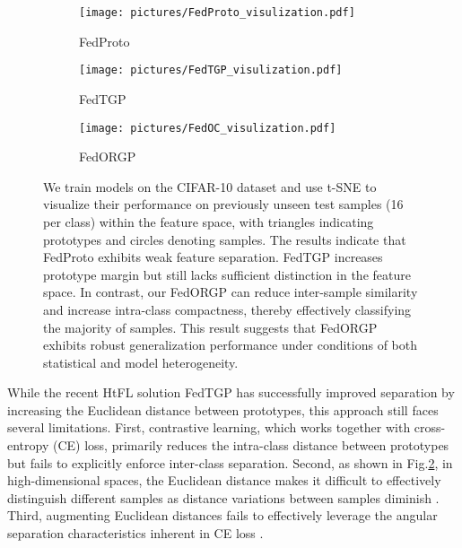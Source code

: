 \begin{figure*}[t]
    \centering
    \begin{subfigure}[b]{0.33\linewidth}
        \texttt{[image: pictures/FedProto\_visulization.pdf]}
        \caption{FedProto}
        \label{fig:FedProto t-SNE}
    \end{subfigure}
    \begin{subfigure}[b]{0.33\linewidth}
        \texttt{[image: pictures/FedTGP\_visulization.pdf]}
        \caption{FedTGP}
        \label{fig:FedTGP t-SNE}
    \end{subfigure}
    \begin{subfigure}[b]{0.33\linewidth}
        \texttt{[image: pictures/FedOC\_visulization.pdf]}
        \caption{FedORGP}
        \label{fig:FedORGP t-SNE}
    \end{subfigure}
    \caption{We train models on the CIFAR-10 dataset and use t-SNE \cite{t-sne} to visualize their performance on previously unseen test samples (16 per class) within the feature space, with triangles indicating prototypes and circles denoting samples. The results indicate that FedProto \cite{tan2022fedproto} exhibits weak feature separation. FedTGP \cite{fedtgp} increases prototype margin but still lacks sufficient distinction in the feature space. In contrast, our FedORGP can reduce inter-sample similarity and increase intra-class compactness, thereby effectively classifying the majority of samples. This result suggests that FedORGP exhibits robust generalization performance under conditions of both statistical and model heterogeneity.}
    \label{fig:distributions}
\end{figure*}

While the recent HtFL solution FedTGP \cite{fedtgp} has successfully improved separation by increasing the Euclidean distance between prototypes, this approach still faces several limitations. First, contrastive learning, which works together with cross-entropy (CE) loss, primarily reduces the intra-class distance between prototypes but fails to explicitly enforce inter-class separation. Second, as shown in Fig.\ref{fig:FedTGP t-SNE}, in high-dimensional spaces, the Euclidean distance makes it difficult to effectively distinguish different samples as distance variations between samples diminish \cite{comprehensive-survey-of-distance}. Third, augmenting Euclidean distances fails to effectively leverage the angular separation characteristics inherent in CE loss \cite{opl}.


